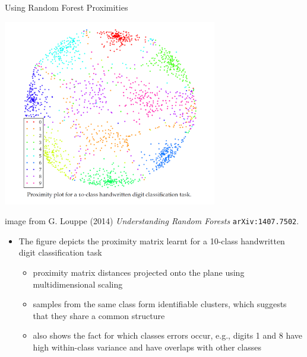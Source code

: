 \documentclass[11pt,compress,t,notes=noshow, xcolor=table]{beamer}
\begin{document}
\begin{vbframe}{Using Random Forest Proximities}
\framebreak

\begin{center}
\includegraphics[width=0.7\textwidth]{figure_man/Proximity_plot.png}
\end{center}
\tiny image from G. Louppe (2014) \emph{Understanding Random Forests} \texttt{arXiv:1407.7502}. 
\framebreak

\begin{itemize}
\item \normalsize The figure depicts the proximity matrix learnt for a 10-class handwritten digit classification task
\begin{itemize}
\item proximity matrix distances projected onto the plane using multidimensional scaling
\item samples from the same class form identifiable clusters, which suggests that they share a common structure
\item also shows the fact for which classes errors occur, e.g.,  digits 1 and 8 have high within-class variance and have overlaps with other classes 
\end{itemize}
\end{itemize}
\end{vbframe}

\endlecture
\end{document}
